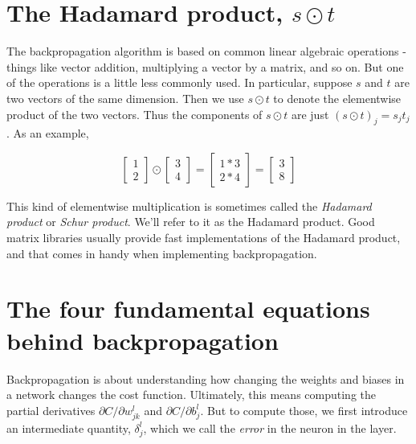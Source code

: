 \section{The Hadamard product, $s\odot t$}

The backpropagation algorithm is based on common linear algebraic operations - things like vector addition, multiplying a vector by a matrix, and so on. But one of the operations is a little less commonly used. In particular, suppose $s$
and $t$ are two vectors of the same dimension. Then we use $s\odot t$ to denote the elementwise product of the two vectors. Thus the components of $s\odot t$ are just $(s \odot t)_{j}=s_{j} t_{j}$. As an example, 

\begin{equation}
\left[ \begin{array}{l}{1} \\ {2}\end{array}\right] \odot \left[ \begin{array}{l}{3} \\ {4}\end{array}\right]=\left[ \begin{array}{l}{1 * 3} \\ {2 * 4}\end{array}\right]=\left[ \begin{array}{l}{3} \\ {8}\end{array}\right]
\label{eq:c02-28}
\end{equation}

This kind of elementwise multiplication is sometimes called the \textit{Hadamard product} or \textit{Schur product}. We'll refer to it as the Hadamard product. Good matrix libraries usually provide fast implementations of the Hadamard product, and that comes in handy when implementing backpropagation.


\section{The four fundamental equations behind backpropagation}
\label{sec:Thefourfundamentalequationsbehindbackpropagation}
Backpropagation is  about understanding how changing the weights and biases in a network changes the cost function. Ultimately, this means computing the partial derivatives $\partial C / \partial w_{j k}^{l}$ and $\partial C / \partial b_{j}^{l}$. But to compute those, we first introduce an intermediate quantity, $\delta_{j}^{l}$, which we call the \textit{error} in the  neuron in the  layer. 

